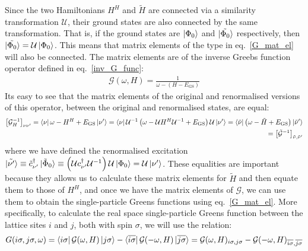 \documentclass{article}
\numberwithin{equation}{section}
\begin{document}
Since the two Hamiltonians $H^H$ and $\tilde H$ are connected via a similarity transformation $\mathcal{U}$, their ground states are also connected by the same transformation. That is, if the ground states are $\ket{\Phi_0}$ and $\ket{\tilde{\Phi_0}}$ respectively, then $\ket{\tilde{\Phi_0}} = \mathcal{U}\ket{\Phi_0}$. This means that matrix elements of the type in eq.~\ref{G_mat_el} will also be connected. The matrix elements are of the inverse Greebs function operator defined in eq.~\ref{inv_G_func}:
 \begin{equation}\begin{aligned}
	 \mathcal{G}(\omega, H) = \frac{1}{\omega - (H - E_\text{GS})}
 \end{aligned}\end{equation}
Its easy to see that the matrix elements of the original and renormalised versions of this operator, between the original and renormalised states, are equal:
\begin{equation}\begin{aligned}
	\left[\mathcal{G}_H^{-1}\right]_{\nu \nu^\prime} = \bra{\nu}\omega - H^H + E_\text{GS}\ket{\nu^\prime} = \bra{\nu} \mathcal{U}^{-1}\left(\omega -  \mathcal{U} H^H  \mathcal{U}^{-1} + E_\text{GS}\right)  \mathcal{U}\ket{\nu^\prime} = \bra{\tilde \nu}\left(\omega - \tilde H + E_\text{GS}\right)\ket{\tilde \nu^\prime}\\
	= \left[\mathcal{\tilde G}^{-1}\right]_{\tilde \nu,\tilde \nu^\prime}
\end{aligned}\end{equation}
where we have defined the renormalised excitation $\ket{\tilde {\nu^\prime}} \equiv \tilde c^\dagger_{\nu^\prime}\ket{\tilde \Phi_0} \equiv  \left(\mathcal{U} c^\dagger_{\nu^\prime}  \mathcal{U}^{-1}\right)  \mathcal{U}\ket{\Phi_0} =  \mathcal{U}\ket{{\nu^\prime}}$. These equalities are important because they allows us to calculate these matrix elements for $\tilde H$ and then equate them to those of $H^H$, and once we have the matrix elements of $\mathcal{G}$, we can use them to obtain the single-particle Greens functions using eq.~\ref{G_mat_el}. More specifically, to calculate the real space single-particle Greens function between the lattice sites $i$ and $j$, both with spin $\sigma$, we will use the relation:
\begin{equation}\begin{aligned}
	G(i\sigma, j\sigma, \omega) = \bra{ i\sigma} \mathcal{G}(\omega, H) \ket{ j\sigma} - \bra{\overline{i\sigma}} \mathcal{G}(-\omega, H) \ket{\overline {j\sigma}} = \mathcal{G}(\omega, H)_{ i\sigma, j\sigma} - \mathcal{G}(-\omega, H)_{\overline{i\sigma}, \overline {j\sigma}}
\end{aligned}\end{equation}
\end{document}
